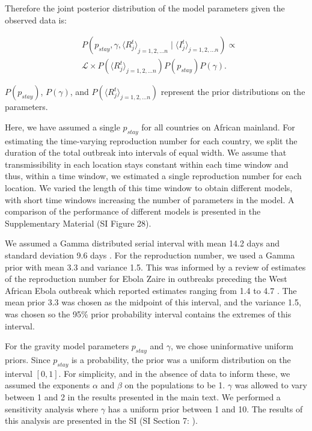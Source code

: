 \documentclass[9pt,twocolumn,twoside,lineno]{pnas-new}
\begin{document}
{Therefore the joint posterior distribution of the model parameters 
given the observed data is:

\begin{equation*}
  \begin{aligned}
  & P(p_{stay}, \gamma, {\langle R_{j}^{t}\rangle}_{j = 1, 2, \dots n}
   \mid 
   \langle I_{j}^{t}\rangle_{j = 1, 2, \dots n} )
   \propto  \\
   & \mathcal{L} \times 
   P\left(\langle R_{j}^{t}\rangle_{j = 1, 2, \dots n}\right) 
   P\left( p_{stay} \right) P\left( \gamma \right).
   \end{aligned}
\end{equation*}

\(P\left( p_{stay} \right)\), \(P\left( \gamma \right)\), and
\(P\left(\langle R_{j}^{t}\rangle_{j = 1, 2, \dots n}\right)\) represent
the prior distributions on the parameters.

Here, we have assumed a single \(p_{stay}\) for all countries on African
mainland. For estimating the time-varying reproduction number for each
country, we split the duration of the total outbreak into intervals of
equal width. We assume that transmissibility in each location stays
constant within each time window and thus, within a time window, we
estimated a single reproduction number for each location. We varied the
length of this time window to obtain different models, with short time
windows increasing the number of parameters in the model. A comparison
of the performance of different models is presented in the Supplementary
Material (SI Figure 28).

We assumed a Gamma distributed serial interval with mean 14.2 days and
standard deviation 9.6 days \cite{team2015west}. For the reproduction
number, we used a Gamma prior with mean 3.3 and variance 1.5. This was
informed by a review of estimates of the reproduction number for Ebola
Zaire in outbreaks preceding the West African Ebola outbreak which
reported estimates ranging from 1.4 to 4.7 \cite{van2015review}. The
mean prior 3.3 was chosen as the midpoint of this interval, and the
variance 1.5, was chosen so the 95\% prior probability interval contains
the extremes of this interval.

For the gravity model parameters \(p_{stay}\) and \(\gamma\), we chose
uninformative uniform priors. Since \(p_{stay}\) is a probability, the
prior was a uniform distribution on the interval \([0, 1]\). For
simplicity, and in the absence of data to inform these, we assumed the
exponents \(\alpha\) and \(\beta\) on the populations to be 1.
\(\gamma\) was allowed to vary between 1 and 2 in the results presented
in the main text. We performed a sensitivity analysis where \(\gamma\)
has a uniform prior between 1 and 10. The results of this analysis are
presented in the SI (SI Section 7: ).

}
\end{document}
